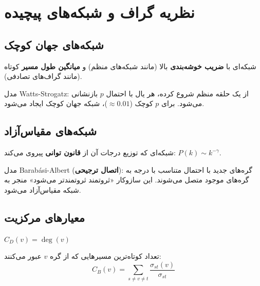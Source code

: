 \documentclass{matinbook}
\begin{document}
    \section{نظریه گراف و شبکه‌های پیچیده}
    
    \subsection{شبکه‌های جهان کوچک}
    
    \begin{definition}
        شبکه‌ای با \textbf{ضریب خوشه‌بندی} بالا
        (مانند شبکه‌های منظم) و
        \textbf{میانگین طول مسیر} کوتاه
        (مانند گراف‌های تصادفی).
        \label{def:small-world}
    \end{definition}
    
    مدل Watts-Strogatz:
    از یک حلقه منظم شروع کرده،
    هر یال با احتمال $p$ بازنشانی می‌شود.
    برای $p$ کوچک ($\approx 0.01$)،
    شبکه جهان کوچک ایجاد می‌شود.
    
    \subsection{شبکه‌های مقیاس‌آزاد}
    
    \begin{definition}
        شبکه‌ای که توزیع درجات آن
        از \textbf{قانون توانی} پیروی می‌کند:
        $P(k) \sim k^{-\gamma}$.
        \label{def:scale-free}
    \end{definition}
    
    مدل Barabási-Albert
    (\textbf{اتصال ترجیحی}):
    گره‌های جدید با احتمال متناسب با درجه
    به گره‌های موجود متصل می‌شوند.
    این سازوکار «ثروتمند ثروتمندتر می‌شود»
    منجر به شبکه مقیاس‌آزاد می‌شود.
    
    \subsection{معیارهای مرکزیت}
    
    \begin{definition}
        $C_{D}(v) = \deg(v)$
        \label{def:degree-centrality}
    \end{definition}
    
    \begin{definition}
        تعداد کوتاه‌ترین مسیرهایی که
        از گره $v$ عبور می‌کنند:
        \[
        C_{B}(v) = \sum_{s \neq v \neq t}
        \frac{\sigma_{st}(v)}{\sigma_{st}}
        \]
        \label{def:betweenness}
    \end{definition}
    
\end{document}
